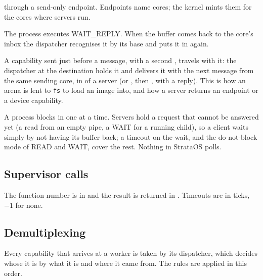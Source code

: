 \begin{description}[leftmargin=1em,style=nextline]
\item[Sending is a user instruction.]  through a send-only endpoint. Endpoints name
  cores; the kernel mints them for the cores where servers run.
\item[Receiving is the kernel's half.] The process executes  WAIT\_REPLY. When the buffer comes
  back to the core's inbox the dispatcher recognises it by its base and puts it in  again.
\item[Attachments.] A capability sent just before a message, with a second , travels with
  it: the dispatcher at the destination holds it and delivers it with the next message from the same
  sending core, in  of a server (or , then , with a reply). This is how an arena
  is lent to \texttt{fs} to load an image into, and how a server returns an endpoint or a device
  capability.
\item[Waiting on several things.] A process blocks in one  at a time. Servers hold a request
  that cannot be answered yet (a read from an empty pipe, a WAIT for a running child), so a client waits
  simply by not having its buffer back; a timeout on the wait, and the do-not-block mode of READ and
  WAIT, cover the rest. Nothing in StrataOS polls.
\end{description}

\subsection{Supervisor calls}\label{sec:os-svc}

The function number is in  and the result is returned in . Timeouts are in ticks,
$-1$ for none.



\subsection{Demultiplexing}\label{sec:os-demux}

Every capability that arrives at a worker is taken by its dispatcher, which decides whose it is by
what it is and where it came from. The rules are applied in this order.

